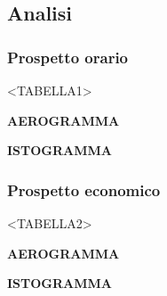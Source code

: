 \subsection{Analisi}

\subsubsection{Prospetto orario}

<TABELLA1>


\textbf{AEROGRAMMA}


\textbf{ISTOGRAMMA}

\subsubsection{Prospetto economico}

<TABELLA2>


\textbf{AEROGRAMMA}


\textbf{ISTOGRAMMA}

